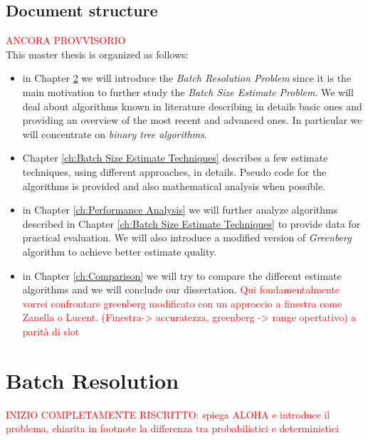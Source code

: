\documentclass[12pt,a4paper]{report}
\begin{document}
\section{Document structure}
\textcolor{red}{ANCORA PROVVISORIO}\\
This master thesis is organized as follows:
\begin{itemize}
\item in Chapter \ref{ch:Batch Resolution} we will introduce the \emph{Batch Resolution Problem} since it is the main motivation to further study the \emph{Batch Size Estimate Problem}. We will deal about algorithms known in literature describing in details basic ones and providing an overview of the most recent and advanced ones. In particular we will concentrate on \emph{binary tree algorithms}.
\item Chapter \ref{ch:Batch Size Estimate Techniques}  describes a few estimate techniques, using different approaches, in details.  Pseudo code for the algorithms is provided  and also mathematical analysis when possible. 

\item in Chapter \ref{ch:Performance Analysis} we will further analyze algorithms described in Chapter \ref{ch:Batch Size Estimate Techniques} to provide data for practical evaluation. We will also introduce a modified version of \emph{Greenberg} algorithm to achieve better estimate quality.
\item in Chapter \ref{ch:Comparison} we will try to compare the different estimate algorithms and we will conclude our dissertation. \textcolor{red}{Qui fondamentalmente vorrei confrontare greenberg modificato con un approccio a finestra come Zanella o Lucent. (Finestra-> accuratezza, greenberg -> range opertativo)  a parità di slot }\\
\end{itemize}

 

\chapter{Batch Resolution}
\label{ch:Batch Resolution}
\textcolor{red}{INIZIO COMPLETAMENTE RISCRITTO: spiega ALOHA e introduce il problema, chiarita in footnote la differenza tra probabilistici e deterministici}\\
\end{document}
